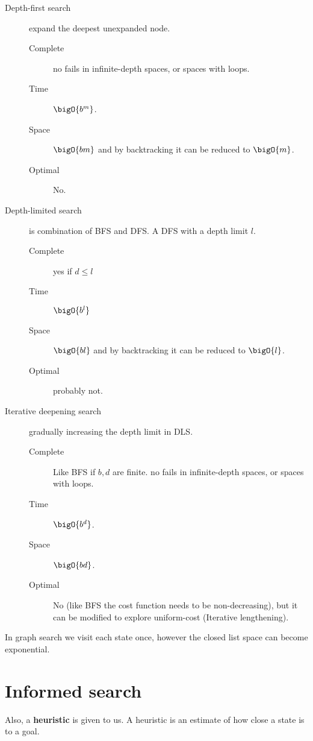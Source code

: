 \begin{description}
    \item [Depth-first search] expand the deepest unexpanded node.
              \begin{description}
                  \item[Complete] no fails in infinite-depth spaces, or spaces with loops.
                  \item[Time] \(\bigO{b^{m}}\).
                  \item[Space] \(\bigO{bm}\) and by backtracking it can be reduced to \(\bigO{m}\).
                  \item[Optimal] No.
              \end{description}
    \item [Depth-limited search] is combination of BFS and DFS. A DFS with a depth limit \(l\).
        \begin{description}
            \item[Complete] yes if \(d \leq l\)
            \item[Time] \(\bigO{b^l}\) 
            \item[Space] \(\bigO{bl}\) and by backtracking it can be reduced to \(\bigO{l}\).
            \item[Optimal] probably not.
        \end{description}
    \item [Iterative deepening search] gradually increasing the depth limit in DLS.
              \begin{description}
                  \item[Complete] Like BFS if \(b,d\) are finite. no fails in infinite-depth spaces, or spaces with loops.
                  \item[Time] \(\bigO{b^{d}}\).
                  \item[Space] \(\bigO{bd}\).
                  \item[Optimal] No (like BFS the cost function needs to be non-decreasing), but it can be modified to explore uniform-cost (Iterative lengthening).
              \end{description}
\end{description}
In graph search we visit each state once, however the closed list space can become exponential.

\section{Informed search}
Also, a \textbf{heuristic} is given to us. A heuristic is an estimate of how close a state is to a goal.
